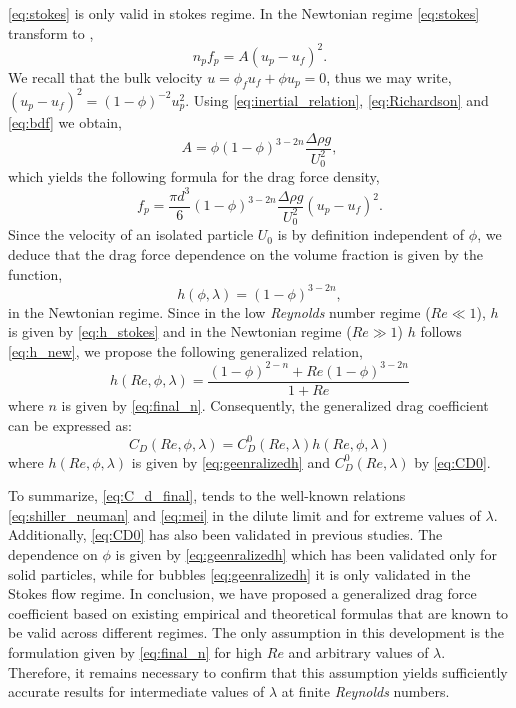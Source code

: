 \ref{eq:stokes} is only valid in stokes regime. 
In the Newtonian regime \ref{eq:stokes} transform to \citep{jackson2000}, 
\begin{equation}
    n_p f_p = A (u_p - u_f)^2. 
    \label{eq:inertial_relation}
\end{equation}
We recall that the bulk velocity $u= \phi_f u_f + \phi u_p = 0$, thus we may write, $(u_p - u_f)^2 = (1-\phi)^{-2} u_p^2$. 
Using \ref{eq:inertial_relation}, \ref{eq:Richardson} and \ref{eq:bdf} we obtain, 
\begin{equation*}
    A = \phi (1- \phi)^{3-2n}\frac{\Delta \rho g}{U_0^2},
\end{equation*}
which yields the following formula for the drag force density, 
\begin{equation}
     f_p =\frac{ \pi d^3}{6}  (1- \phi)^{3-2n}\frac{\Delta \rho g}{U_0^2} (u_p - u_f)^2. 
\end{equation}
Since the velocity of an isolated particle $U_0$ is by definition independent of $\phi$, we deduce that the drag force dependence on the volume fraction is given by the function, 
\begin{equation}
    h(\phi,\lambda)
    = 
    (1-\phi)^{3- 2n},
    \label{eq:h_new}
\end{equation}
in the Newtonian regime. 
Since in the low \textit{Reynolds} number regime ($Re\ll 1$), $h$ is given by \ref{eq:h_stokes} and in the Newtonian regime ($Re \gg 1$) $h$  follows \ref{eq:h_new}, we propose the following generalized relation,
\begin{equation}
    h(Re,\phi,\lambda)
    = \frac{(1-\phi)^{2-n}+ Re (1-\phi)^{3-2n}}{1+Re}
    \label{eq:geenralizedh}
\end{equation}
where $n$ is given by \ref{eq:final_n}. 
Consequently, the generalized drag coefficient can be expressed as:
\begin{equation}
    C_D(Re,\phi,\lambda)
    = 
    C_D^0(Re,\lambda)
    h(Re,\phi,\lambda)
    \label{eq:C_d_finalRe}
\end{equation}
where $h(Re,\phi,\lambda)$ is given by \ref{eq:geenralizedh} and $C_D^0(Re,\lambda)$ by \ref{eq:CD0}. 


To summarize, \ref{eq:C_d_final}, tends to the well-known relations \ref{eq:shiller_neuman} and \ref{eq:mei} in the dilute limit and for extreme values of $\lambda$.
Additionally, \ref{eq:CD0} has also been validated in previous studies. 
The dependence on $\phi$ is given by \ref{eq:geenralizedh} which has been validated only for solid particles, while for bubbles \ref{eq:geenralizedh} it is only validated in the Stokes flow regime. 
In conclusion, we have proposed a generalized drag force coefficient based on existing empirical and theoretical formulas that are known to be valid across different regimes. 
The only assumption in this development is the formulation given by \ref{eq:final_n} for high $Re$ and arbitrary values of $\lambda$. 
Therefore, it remains necessary to confirm that this assumption yields sufficiently accurate results for intermediate values of $\lambda$ at finite \textit{Reynolds} numbers. 


